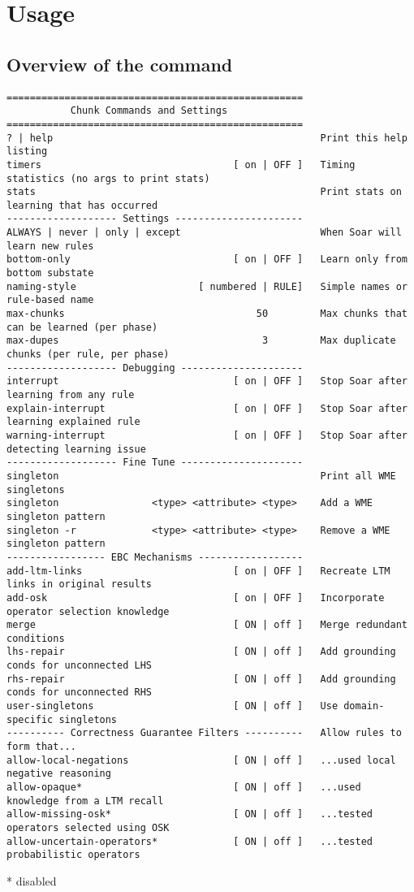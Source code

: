 \section{Usage}
\label{CHUNKING-usage}

\subsection{Overview of the  command}

{\footnotesize
\begin{verbatim}
===================================================
           Chunk Commands and Settings
===================================================
? | help                                              Print this help listing
timers                                 [ on | OFF ]   Timing statistics (no args to print stats)
stats                                                 Print stats on learning that has occurred
------------------- Settings ----------------------
ALWAYS | never | only | except                        When Soar will learn new rules
bottom-only                            [ on | OFF ]   Learn only from bottom substate
naming-style                     [ numbered | RULE]   Simple names or rule-based name
max-chunks                                 50         Max chunks that can be learned (per phase)
max-dupes                                   3         Max duplicate chunks (per rule, per phase)
------------------- Debugging ---------------------
interrupt                              [ on | OFF ]   Stop Soar after learning from any rule
explain-interrupt                      [ on | OFF ]   Stop Soar after learning explained rule
warning-interrupt                      [ on | OFF ]   Stop Soar after detecting learning issue
------------------- Fine Tune ---------------------
singleton                                             Print all WME singletons
singleton                <type> <attribute> <type>    Add a WME singleton pattern
singleton -r             <type> <attribute> <type>    Remove a WME singleton pattern
----------------- EBC Mechanisms ------------------
add-ltm-links                          [ on | OFF ]   Recreate LTM links in original results
add-osk                                [ on | OFF ]   Incorporate operator selection knowledge
merge                                  [ ON | off ]   Merge redundant conditions
lhs-repair                             [ ON | off ]   Add grounding conds for unconnected LHS
rhs-repair                             [ ON | off ]   Add grounding conds for unconnected RHS
user-singletons                        [ ON | off ]   Use domain-specific singletons
---------- Correctness Guarantee Filters ----------   Allow rules to form that...
allow-local-negations                  [ ON | off ]   ...used local negative reasoning
allow-opaque*                          [ ON | off ]   ...used knowledge from a LTM recall
allow-missing-osk*                     [ ON | off ]   ...tested operators selected using OSK
allow-uncertain-operators*             [ ON | off ]   ...tested probabilistic operators
\end{verbatim}
* disabled
}


